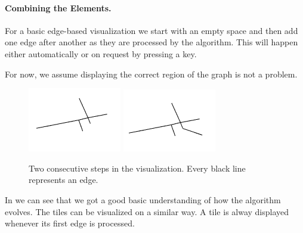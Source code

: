 \documentclass
[
    paper = a4,
    pagesize,
    12 pt,
    oneside,                       %
    open = right,
    DIV = calc,
    BCOR = 0 mm,                   %
    bibtotoc
]
{scrbook}
\begin{document}
\paragraph{Combining the Elements.}

For a basic edge-based visualization we start with an empty space and then add one edge after another as they are processed by the algorithm.
This will happen either automatically or on request by pressing a key.

For now, we assume displaying the correct region of the graph is not a problem.

\begin{figure}
    \includegraphics[width=.5\textwidth]{Images/vis-step-one.png}
    \includegraphics[width=.5\textwidth]{Images/vis-step-two.png}
\caption{Two consecutive steps in the visualization. Every black line represents an edge.}
\label{fig:two-steps}
\end{figure}

In  we can see that we got a good basic understanding of how the algorithm evolves.
The tiles can be visualized on a similar way.
A tile is alway displayed whenever its first edge is processed.
\end{document}
